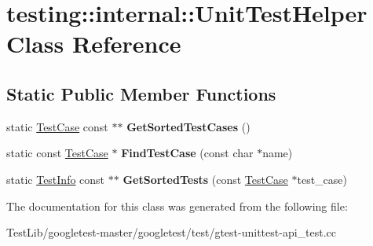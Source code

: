 \hypertarget{classtesting_1_1internal_1_1UnitTestHelper}{}\section{testing\+:\+:internal\+:\+:Unit\+Test\+Helper Class Reference}
\label{classtesting_1_1internal_1_1UnitTestHelper}
\subsection*{Static Public Member Functions}
\begin{DoxyCompactItemize}
\item 
\mbox{\label{classtesting_1_1internal_1_1UnitTestHelper_a9a549307062083d10358638af272cc98}} 
static \hyperlink{classtesting_1_1TestCase}{Test\+Case} const  $\ast$$\ast$ {\bfseries Get\+Sorted\+Test\+Cases} ()
\item 
\mbox{\label{classtesting_1_1internal_1_1UnitTestHelper_a46303cbb7a6abb456f7b1350542113ac}} 
static const \hyperlink{classtesting_1_1TestCase}{Test\+Case} $\ast$ {\bfseries Find\+Test\+Case} (const char $\ast$name)
\item 
\mbox{\label{classtesting_1_1internal_1_1UnitTestHelper_a02602d22fb74566dad78c0c9d4f24e78}} 
static \hyperlink{classtesting_1_1TestInfo}{Test\+Info} const  $\ast$$\ast$ {\bfseries Get\+Sorted\+Tests} (const \hyperlink{classtesting_1_1TestCase}{Test\+Case} $\ast$test\+\_\+case)
\end{DoxyCompactItemize}


The documentation for this class was generated from the following file\+:\begin{DoxyCompactItemize}
\item 
Test\+Lib/googletest-\/master/googletest/test/gtest-\/unittest-\/api\+\_\+test.\+cc\end{DoxyCompactItemize}
